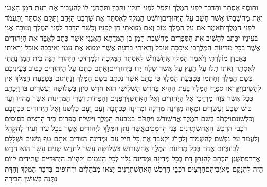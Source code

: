 \documentclass[../main/main.tex]{subfiles}
\begin{document}
\begin{multicols}{\ncols}
וַתּוֹסֶף אֶסְתֵּר וַתְּדַבֵּר לִפְנֵי הַמֶּלֶךְ וַתִּפֹּל לִפְנֵי רַגְלָיו וַתֵּבְךְּ וַתִּתְחַנֶּן לוֹ לְהַעֲבִיר אֶת רָעַת הָמָן הָאֲגָגִי וְאֵת מַחֲשַׁבְתּוֹ אֲשֶׁר חָשַׁב עַל הַיְּהוּדִים\PreVerseSpace{}וַיּוֹשֶׁט הַמֶּלֶךְ לְאֶסְתֵּר אֵת שַׁרְבִט הַזָּהָב וַתָּקָם אֶסְתֵּר וַתַּעֲמֹד לִפְנֵי הַמֶּלֶךְ\PreVerseSpace{}וַתֹּאמֶר אִם עַל הַמֶּלֶךְ טוֹב וְאִם מָצָאתִי חֵן לְפָנָיו וְכָשֵׁר הַדָּבָר לִפְנֵי הַמֶּלֶךְ וְטוֹבָה אֲנִי בְּעֵינָיו יִכָּתֵב לְהָשִׁיב אֶת הַסְּפָרִים מַחֲשֶׁבֶת הָמָן בֶּן הַמְּדָתָא הָאֲגָגִי אֲשֶׁר כָּתַב לְאַבֵּד אֶת הַיְּהוּדִים אֲשֶׁר בְּכָל מְדִינוֹת הַמֶּלֶךְ\PreVerseSpace{}כִּי אֵיכָכָה אוּכַל וְרָאִיתִי בָּרָעָה אֲשֶׁר יִמְצָא אֶת עַמִּי וְאֵיכָכָה אוּכַל וְרָאִיתִי בְּאָבְדַן מוֹלַדְתִּי \ClosedSection{}וַיֹּאמֶר הַמֶּלֶךְ אֲחַשְׁוֵרֹשׁ לְאֶסְתֵּר הַמַּלְכָּה וּלְמָרְדֳּכַי הַיְּהוּדִי הִנֵּה בֵית הָמָן נָתַתִּי לְאֶסְתֵּר וְאֹתוֹ תָּלוּ עַל הָעֵץ עַל אֲשֶׁר שָׁלַח יָדוֹ בַּיְּהוּדִיּים\PreVerseSpace{}וְאַתֶּם כִּתְבוּ עַל הַיְּהוּדִים כַּטּוֹב בְּעֵינֵיכֶם בְּשֵׁם הַמֶּלֶךְ וְחִתְמוּ בְּטַבַּעַת הַמֶּלֶךְ כִּי כְתָב אֲשֶׁר נִכְתָּב בְּשֵׁם הַמֶּלֶךְ וְנַחְתּוֹם בְּטַבַּעַת הַמֶּלֶךְ אֵין לְהָשִׁיב\PreVerseSpace{}וַיִּקָּרְאוּ סֹפְרֵי הַמֶּלֶךְ בָּעֵת הַהִיא בַּחֹדֶשׁ הַשְּׁלִישִׁי הוּא חֹדֶשׁ סִיוָן בִּשְׁלוֹשָׁה וְעֶשְׂרִים בּוֹ וַיִּכָּתֵב כְּכָל אֲשֶׁר צִוָּה מָרְדֳּכַי אֶל הַיְּהוּדִים וְאֶל הָאֲחַשְׁדַּרְפְּנִים וְהַפַּחוֹת וְשָׂרֵי הַמְּדִינוֹת אֲשֶׁר מֵהֹדּוּ וְעַד כּוּשׁ שֶׁבַע וְעֶשְׂרִים וּמֵאָה מְדִינָה מְדִינָה וּמְדִינָה כִּכְתָבָהּ וְעַם וָעָם כִּלְשֹׁנוֹ וְאֶל הַיְּהוּדִים כִּכְתָבָם וְכִלְשׁוֹנָם\PreVerseSpace{}וַיִּכְתֹּב בְּשֵׁם הַמֶּלֶךְ אֲחַשְׁוֵרֹשׁ וַיַּחְתֹּם בְּטַבַּעַת הַמֶּלֶךְ וַיִּשְׁלַח סְפָרִים בְּיַד הָרָצִים בַּסּוּסִים רֹכְבֵי הָרֶכֶשׁ הָאֲחַשְׁתְּרָנִים בְּנֵי הָרַמָּכִים\PreVerseSpace{}אֲשֶׁר נָתַן הַמֶּלֶךְ לַיְּהוּדִים אֲשֶׁר בְּכָל עִיר וָעִיר לְהִקָּהֵל וְלַעֲמֹד עַל נַפְשָׁם לְהַשְׁמִיד וְלַהֲרֹג וּלְאַבֵּד אֶת כָּל חֵיל עַם וּמְדִינָה הַצָּרִים אֹתָם טַף וְנָשִׁים וּשְׁלָלָם לָבוֹז\PreVerseSpace{}בְּיוֹם אֶחָד בְּכָל מְדִינוֹת הַמֶּלֶךְ אֲחַשְׁוֵרוֹשׁ בִּשְׁלוֹשָׁה עָשָׂר לְחֹדֶשׁ שְׁנֵים עָשָׂר הוּא חֹדֶשׁ אֲדָר\PreVerseSpace{}פַּתְשֶׁגֶן הַכְּתָב לְהִנָּתֵן דָּת בְּכָל מְדִינָה וּמְדִינָה גָּלוּי לְכָל הָעַמִּים וְלִהְיוֹת הַיְּהוּדִיּים עֲתִידִים\SubEnd{} לַיּוֹם הַזֶּה לְהִנָּקֵם מֵאֹיְבֵיהֶם\PreVerseSpace{}הָרָצִים רֹכְבֵי הָרֶכֶשׁ הָאֲחַשְׁתְּרָנִים יָצְאוּ מְבֹהָלִים וּדְחוּפִים בִּדְבַר הַמֶּלֶךְ וְהַדָּת נִתְּנָה בְּשׁוּשַׁן הַבִּירָה\OpenSection{}\par

\end{multicols}
\end{document}
